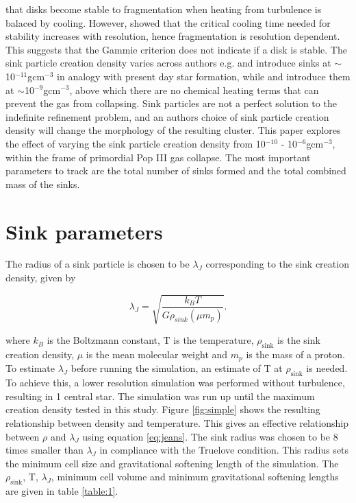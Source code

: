 \documentclass[fleqn,usenatbib]{mnras}
\begin{document}
that disks become stable to fragmentation when heating from turbulence is balaced by cooling. However, \cite{Meru2011} showed that the critical cooling time needed for stability increases with resolution, hence fragmentation is resolution dependent. This suggests that the Gammie criterion does not indicate if a disk is stable. The sink particle creation density varies across authors e.g. \cite{Clark2011} and \cite{Sharda2020} introduce sinks at $\sim$10$^{-11}$gcm$^{-3}$ in analogy with present day star formation, while \cite{Smith2011} and \cite{Wollenberg2019} introduce them at $\sim$10$^{-9}$gcm$^{-3}$, above which there are no chemical heating terms that can prevent the gas from collapsing. Sink particles are not a perfect solution to the indefinite refinement problem, and an authors choice of sink particle creation density will change the morphology of the resulting cluster. This paper explores the effect of varying the sink particle creation density from 10$^{-10}$ - 10$^{-6}$gcm$^{-3}$, within the frame of primordial Pop III gas collapse. The most important parameters to track are the total number of sinks formed and the total combined mass of the sinks.



\section{Sink parameters}

The radius of a sink particle is chosen to be $\lambda_J$ corresponding to the sink creation density, given by


\begin{equation}
    \lambda_J=\sqrt{  \frac{k_B T} {G \rho_{sink} (\mu m_p)}}.
	\label{eq:jeans}
\end{equation}

where $k_B$ is the Boltzmann constant, T is the temperature, $\rho_{\text{sink}}$ is the sink creation density, $\mu$ is the mean molecular weight and $m_p$ is the mass of a proton. To estimate $\lambda_J$ before running the simulation, an estimate of T at $\rho_{\text{sink}}$ is needed. To achieve this, a lower resolution simulation was performed without turbulence, resulting in 1 central star. The simulation was run up until the maximum creation density tested in this study. Figure \ref{fig:simple} shows the resulting relationship between density and temperature. This gives an effective relationship between $\rho$ and $\lambda_J$ using equation \ref{eq:jeans}. The sink radius was chosen to be 8 times smaller than $\lambda_J$ in compliance with the Truelove condition. This radius sets the minimum cell size and gravitational softening length of the simulation. The $\rho_{\text{sink}}$, T, $\lambda_J$, minimum cell volume and minimum gravitational softening lengths are given in table \ref{table:1}.
\end{document}
